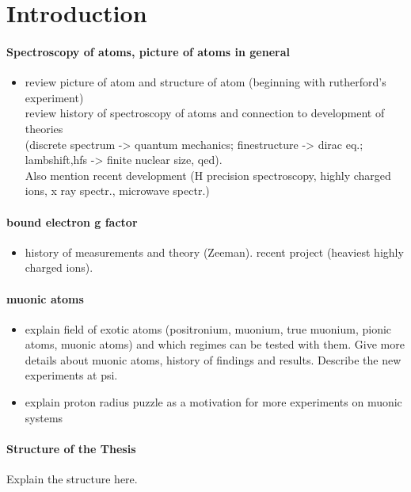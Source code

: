 \chapter*{Introduction}

\subsubsection*{Spectroscopy of atoms, picture of atoms in general}
\begin{itemize}
\item
review picture of atom and structure of atom (beginning with rutherford's experiment)\\
review history of spectroscopy of atoms and connection to development of theories\\
(discrete spectrum -> quantum mechanics; finestructure -> dirac eq.; lambshift,hfs -> finite nuclear size, qed). \\
Also mention recent development (H precision spectroscopy, highly charged ions, x ray spectr., microwave spectr.)\\
\end{itemize}

\subsubsection*{bound electron g factor}
\begin{itemize}
\item
history of measurements and theory (Zeeman). recent project (heaviest highly charged ions). 
\end{itemize}

\subsubsection*{muonic atoms}
\begin{itemize}
\item
explain field of exotic atoms (positronium, muonium, true muonium, pionic atoms, muonic atoms) and which regimes can be tested with them. Give more details about muonic atoms, history of findings and results. Describe the new experiments at psi.
\item 
explain proton radius puzzle as a motivation for more experiments on muonic systems
\end{itemize}



\subsubsection*{Structure of the Thesis}

Explain the structure here.




